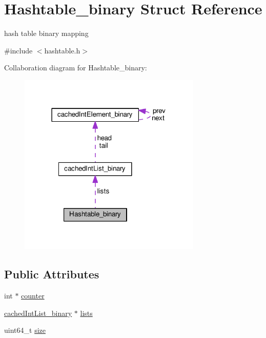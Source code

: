 \hypertarget{structHashtable__binary}{}\section{Hashtable\+\_\+binary Struct Reference}
\label{structHashtable__binary}


hash table binary mapping  




{\ttfamily \#include $<$hashtable.\+h$>$}



Collaboration diagram for Hashtable\+\_\+binary\+:\nopagebreak
\begin{figure}[H]
\begin{center}
\leavevmode
\includegraphics[width=247pt]{structHashtable__binary__coll__graph}
\end{center}
\end{figure}
\subsection*{Public Attributes}
\begin{DoxyCompactItemize}
\item 
int $\ast$ \hyperlink{structHashtable__binary_a84f8baf046a4f7a75a405e8fd448bac8}{counter}
\item 
\hyperlink{structcachedIntList__binary}{cached\+Int\+List\+\_\+binary} $\ast$ \hyperlink{structHashtable__binary_a6c33200915e4022c6c561f35fc36d4e0}{lists}
\item 
uint64\+\_\+t \hyperlink{structHashtable__binary_a2232ebf98285e8d0154badb1db51fdc5}{size}
\end{DoxyCompactItemize}


